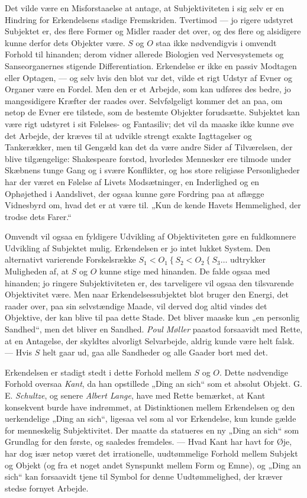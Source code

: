 \documentclass[12pt,a4paper]{book}
\newcommand{\apage}[1]{\marginnote{\footnotesize\textit{[#1]}}}
\begin{document}
Det vilde være en Misforstaaelse at antage, at Subjektiviteten i sig selv er en
Hindring for Erkendelsens stadige Fremskriden. Tvertimod --- jo rigere udstyret
Subjektet er, des flere Former og Midler raader det over, og des flere og alsidigere
kunne derfor dets Objekter være. $S$ og $O$ staa ikke nødvendigvis i omvendt Forhold
til hinanden; derom vidner allerede Biologien ved Nervesystemets og Sanseorganernes
stigende Differentiation. Erkendelse er ikke en passiv Modtagen eller Optagen, --- og
selv hvis den blot var det, vilde et rigt Udstyr af Evner og Organer være en Fordel.
Men den er et Arbejde, som kan udføres des bedre, jo mangesidigere Kræfter der raades
over. Selvfølgeligt kommer det an paa, om netop de Evner ere tilstede, som de bestemte
Objekter forudsætte. Subjektet kan være rigt udstyret i sit Følelses- og Fantasiliv;
det vil da maaske ikke kunne øve det Arbejde, der kræves til at udvikle strengt exakte
Iagttagelser og Tankerækker, men til Gengæld kan det da være andre \apage{302} Sider af
Tilværelsen, der blive tilgængelige: Shakespeare forstod, hvorledes Mennesker
ere tilmode under Skæbnens tunge Gang og i svære Konflikter, og hos store religiøse
Personligheder har der været en Følelse af Livets Modsætninger, en Inderlighed og en
Ophøjethed i Aandslivet, der ogsaa kunne gøre Fordring paa at aflægge Vidnesbyrd om,
hvad det er at være til. „Kun de kende Havets Hemmelighed, der trodse dets Farer.“

Omvendt vil ogsaa en fyldigere Udvikling af Objektiviteten gøre en fuldkomnere
Udvikling af Subjektet mulig. Erkendelsen er jo intet lukket System. Den alternativt
varierende Forskelsrække $S_1 < O_1 \mathrel{\{} S_2 < O_2 \mathrel{\{} S_3 \ldots$
udtrykker Muligheden af, at $S$ og $O$ kunne stige med hinanden. De falde ogsaa med
hinanden; jo ringere Subjektiviteten er, des tarveligere vil ogsaa den tilsvarende
Objektivitet være. Men naar Erkendelsessubjektet blot bruger den Energi, det raader
over, paa sin selvstændige Maade, vil derved dog altid vindes det Objektive, der kan
blive til paa dette Stade. Det bliver maaske kun „en personlig Sandhed“, men det
bliver en Sandhed. \emph{Poul Møller} paastod forsaavidt med Rette, at en Antagelse,
der skyldtes alvorligt Selvarbejde, aldrig kunde være helt falsk. --- Hvis $S$ helt
gaar ud, gaa alle Sandheder og alle Gaader bort med det.

Erkendelsen er stadigt stedt i dette Forhold mellem $S$ og $O$. Dette nødvendige
Forhold oversaa \emph{Kant}, da han opstillede „Ding an sich“ som et absolut Objekt.
G. E. \emph{Schultze}, og senere \emph{Albert Lange}, have med Rette bemærket, at Kant
konsekvent burde have indrømmet, at Distinktionen mellem Erkendelsen og den
uerkendelige „Ding an sich“, ligesaa vel som al vor Erkendelse, kun kunde gælde for
menneskelig Subjektivitet. Der maatte da statueres en ny „Ding an sich“ som Grundlag
for den første, og saaledes fremdeles. --- Hvad Kant har havt for Øje, har dog især
netop været det irrationelle, uudtømmelige Forhold mellem Subjekt og Objekt (og fra et
noget andet Synspunkt mellem Form og Emne), og „Ding an sich“ kan forsaavidt tjene til
Symbol for denne Uudtømmelighed, der kræver stedse fornyet Arbejde.
\end{document}
